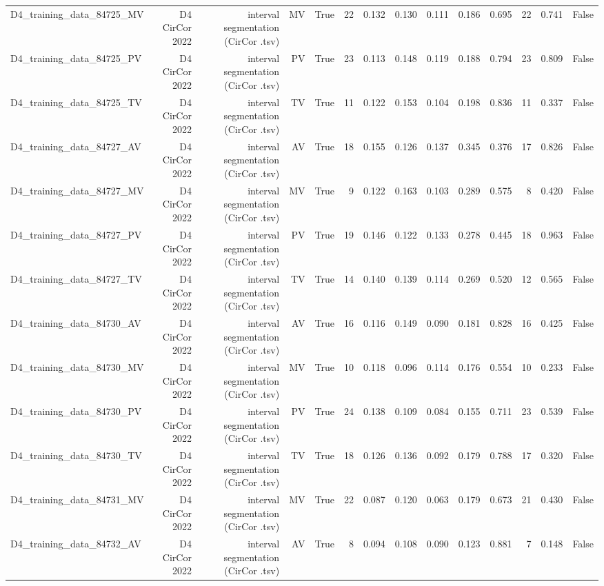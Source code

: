 \begin{table}[htbp]
\begin{tabular}{lrrrrrrrrrrrrr}
    D4\_training\_data\_84725\_MV & D4 CirCor 2022 & interval segmentation (CirCor .tsv) & MV & True & 22 & 0.132 & 0.130 & 0.111 & 0.186 & 0.695 & 22 & 0.741 & False \\
    D4\_training\_data\_84725\_PV & D4 CirCor 2022 & interval segmentation (CirCor .tsv) & PV & True & 23 & 0.113 & 0.148 & 0.119 & 0.188 & 0.794 & 23 & 0.809 & False \\
    D4\_training\_data\_84725\_TV & D4 CirCor 2022 & interval segmentation (CirCor .tsv) & TV & True & 11 & 0.122 & 0.153 & 0.104 & 0.198 & 0.836 & 11 & 0.337 & False \\
    D4\_training\_data\_84727\_AV & D4 CirCor 2022 & interval segmentation (CirCor .tsv) & AV & True & 18 & 0.155 & 0.126 & 0.137 & 0.345 & 0.376 & 17 & 0.826 & False \\
    D4\_training\_data\_84727\_MV & D4 CirCor 2022 & interval segmentation (CirCor .tsv) & MV & True & 9 & 0.122 & 0.163 & 0.103 & 0.289 & 0.575 & 8 & 0.420 & False \\
    D4\_training\_data\_84727\_PV & D4 CirCor 2022 & interval segmentation (CirCor .tsv) & PV & True & 19 & 0.146 & 0.122 & 0.133 & 0.278 & 0.445 & 18 & 0.963 & False \\
    D4\_training\_data\_84727\_TV & D4 CirCor 2022 & interval segmentation (CirCor .tsv) & TV & True & 14 & 0.140 & 0.139 & 0.114 & 0.269 & 0.520 & 12 & 0.565 & False \\
    D4\_training\_data\_84730\_AV & D4 CirCor 2022 & interval segmentation (CirCor .tsv) & AV & True & 16 & 0.116 & 0.149 & 0.090 & 0.181 & 0.828 & 16 & 0.425 & False \\
    D4\_training\_data\_84730\_MV & D4 CirCor 2022 & interval segmentation (CirCor .tsv) & MV & True & 10 & 0.118 & 0.096 & 0.114 & 0.176 & 0.554 & 10 & 0.233 & False \\
    D4\_training\_data\_84730\_PV & D4 CirCor 2022 & interval segmentation (CirCor .tsv) & PV & True & 24 & 0.138 & 0.109 & 0.084 & 0.155 & 0.711 & 23 & 0.539 & False \\
    D4\_training\_data\_84730\_TV & D4 CirCor 2022 & interval segmentation (CirCor .tsv) & TV & True & 18 & 0.126 & 0.136 & 0.092 & 0.179 & 0.788 & 17 & 0.320 & False \\
    D4\_training\_data\_84731\_MV & D4 CirCor 2022 & interval segmentation (CirCor .tsv) & MV & True & 22 & 0.087 & 0.120 & 0.063 & 0.179 & 0.673 & 21 & 0.430 & False \\
    D4\_training\_data\_84732\_AV & D4 CirCor 2022 & interval segmentation (CirCor .tsv) & AV & True & 8 & 0.094 & 0.108 & 0.090 & 0.123 & 0.881 & 7 & 0.148 & False \\

\end{tabular}
\end{table}
